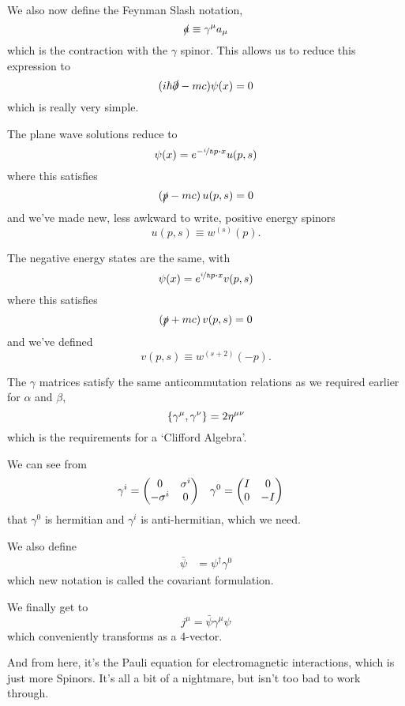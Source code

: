 \documentclass[]{revision-notes}
\begin{document}
We also now define the Feynman Slash notation, \[\slashed{a} \equiv \gamma^\mu a_\mu \] which is the contraction with the \(\gamma\) spinor.
This allows us to reduce this expression to \[ (i \hbar \slashed{\partial}- mc) \psi(x) = 0\] which is really very simple.

The plane wave solutions reduce to \[ \psi(x) = e^{-\nicefrac{i}{\hbar}p\vdot x} u(p, s) \] where this satisfies
\[ (\slashed{p} - mc)\, u(p, s) = 0 \]
and we've made new, less awkward to write, positive energy spinors \[ u(p, s) \equiv w^{(s)}(p).\]

The negative energy states are the same, with \[ \psi(x) = e^{\nicefrac{i}{\hbar}p\vdot x} v(p, s) \] where this satisfies
\[ (\slashed{p} + mc)\, v(p, s) = 0 \] and we've defined \[v(p, s) \equiv w^{(s + 2)}(-p).\]

The \(\gamma\) matrices satisfy the same anticommutation relations as we required earlier for \(\alpha\) and \(\beta\),
\[ \anticommutator{\gamma^\mu}{\gamma^\nu} = 2 \eta^{\mu\nu} \]
which is the requirements for a `Clifford Algebra'.

We can see from
\begin{align*}
  \gamma^i &= \mqty(0 & \sigma^i\\ - \sigma^i & 0) & \gamma^0 &= \mqty(I&0\\0&-I)
\end{align*} that \(\gamma^0\) is hermitian and \(\gamma^i \) is anti-hermitian, which we need.

We also define
\begin{align*}
  \bar{\psi} &= \psi^\dagger \gamma^0
\end{align*}
which new notation is called the covariant formulation.

We finally get to \[ j^\mu = \bar{\psi} \gamma^\mu \psi\] which conveniently transforms as a 4-vector.

\begin{note}
And from here, it's the Pauli equation for electromagnetic interactions, which is just more Spinors. It's all a bit of a nightmare, but isn't too bad to work through.
\end{note}



\printbibliography
\end{document}

